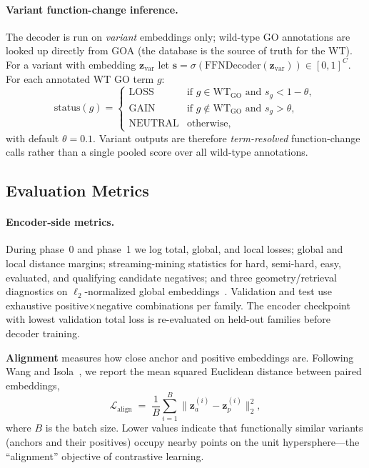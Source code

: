 \documentclass[11pt,a4paper]{article}
\begin{document}
\paragraph{Variant function-change inference.}
The decoder is run on \emph{variant} embeddings only; wild-type GO annotations are looked up directly from GOA (the database is the source of truth for the WT). For a variant with embedding $\mathbf{z}_{\text{var}}$ let $\mathbf{s}=\sigma(\text{FFNDecoder}(\mathbf{z}_{\text{var}}))\in[0,1]^C$. For each annotated WT GO term $g$:
\[
\text{status}(g) =
\begin{cases}
\text{LOSS} & \text{if } g \in \mathrm{WT}_{\text{GO}} \text{ and } s_g < 1-\theta,\\
\text{GAIN} & \text{if } g \notin \mathrm{WT}_{\text{GO}} \text{ and } s_g > \theta,\\
\text{NEUTRAL} & \text{otherwise,}
\end{cases}
\]
with default $\theta=0.1$. Variant outputs are therefore \emph{term-resolved} function-change calls rather than a single pooled score over all wild-type annotations.

\subsection{Evaluation Metrics}

\paragraph{Encoder-side metrics.}
During phase~0 and phase~1 we log total, global, and local losses; global and local distance margins; streaming-mining statistics for hard, semi-hard, easy, evaluated, and qualifying candidate negatives; and three geometry/retrieval diagnostics on $\ell_2$-normalized global embeddings~\cite{wang2020hypersphere}. Validation and test use exhaustive positive$\times$negative combinations per family. The encoder checkpoint with lowest validation total loss is re-evaluated on held-out families before decoder training.

\textbf{Alignment} measures how close anchor and positive embeddings are. Following Wang and Isola~\cite{wang2020hypersphere}, we report the mean squared Euclidean distance between paired embeddings,
\[
\mathcal{L}_{\text{align}} \;=\; \frac{1}{B}\sum_{i=1}^{B}\|\mathbf{z}_a^{(i)}-\mathbf{z}_p^{(i)}\|_2^2,
\]
where $B$ is the batch size. Lower values indicate that functionally similar variants (anchors and their positives) occupy nearby points on the unit hypersphere---the ``alignment'' objective of contrastive learning.
\end{document}
